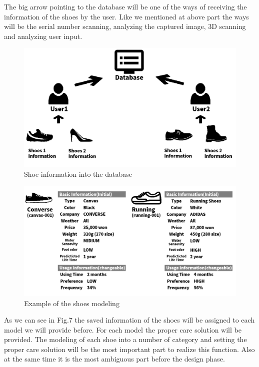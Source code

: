 \documentclass[conference]{IEEEtran}
\begin{document}
The big arrow pointing to the database will be one of the ways of receiving the information of the shoes by the user. Like we mentioned at above part the ways will be the serial number scanning, analyzing the captured image, 3D scanning and analyzing user input.

\begin{figure}[H]
\begin{center}
    \includegraphics[scale=0.28]{management1}
    \caption{Shoe information into the database} \label{fig:label}
\end{center}
\end{figure}
\begin{figure}[H]
\begin{center}
    \includegraphics[scale=0.24]{management2}
    \caption{Example of the shoes modeling } \label{fig:label}
\end{center}
\end{figure}

As we can see in Fig.7 the saved information of the shoes will be assigned to each model we will provide before. For each model the proper care solution will be provided. 
The modeling of each shoe into a number of category and setting the proper care solution will be the most important part to realize this function. Also at the same time it is the most ambiguous part before the design phase.
\end{document}
